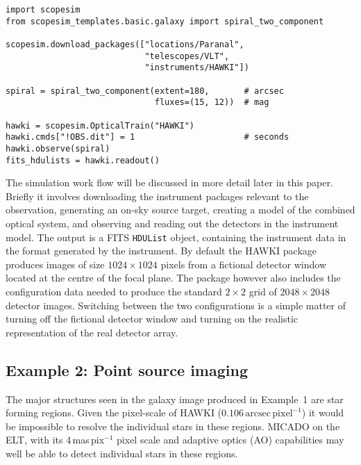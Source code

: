 \begin{lstlisting}[frame=single]
import scopesim
from scopesim_templates.basic.galaxy import spiral_two_component

scopesim.download_packages(["locations/Paranal",
                            "telescopes/VLT",
                            "instruments/HAWKI"])

spiral = spiral_two_component(extent=180,       # arcsec
                              fluxes=(15, 12))  # mag

hawki = scopesim.OpticalTrain("HAWKI")
hawki.cmds["!OBS.dit"] = 1                      # seconds
hawki.observe(spiral)
fits_hdulists = hawki.readout()
\end{lstlisting}

The simulation work flow will be discussed in more detail later in this paper.
Briefly it involves downloading the instrument packages relevant to the observation, generating an on-sky source target, creating a model of the combined optical system, and observing and reading out the detectors in the instrument model.
The output is a FITS \lstinline{HDUList} object, containing the instrument data in the format generated by the instrument.
By default the HAWKI package produces images of size $1024\times 1024$ pixels from a fictional detector window located at the centre of the focal plane.
The package however also includes the configuration data needed to produce the standard $2\times2$ grid of $2048\times 2048$ detector images.
Switching between the two configurations is a simple matter of turning off the fictional detector window and turning on the realistic representation of the real detector array.


\subsection{Example 2: Point source imaging}
\label{example-2-point-source-imaging}

The major structures seen in the galaxy image produced in Example~1 are star forming regions.
Given the pixel-scale of HAWKI ($0.106\,\mathrm{arcsec\,pixel^{-1}}$) it would be impossible to resolve the individual stars in these regions.
MICADO on the ELT, with its 4\,mas\,pix$^{-1}$ pixel scale\cite{micado2018} and adaptive optics (AO) capabilities may well be able to detect individual stars in these regions.

